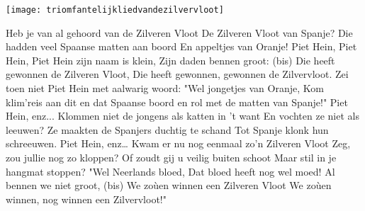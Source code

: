 \begin{intersong}
    \texttt{[image: triomfantelijkliedvandezilvervloot]}
\end{intersong}
\beginverse*
Heb je van al gehoord van de Zilveren Vloot
De Zilveren Vloot van Spanje?
Die hadden veel Spaanse matten aan boord
En appeltjes van Oranje!
Piet Hein, Piet Hein,
Piet Hein zijn naam is klein,
Zijn daden bennen groot: (bis)
Die heeft gewonnen de Zilveren Vloot,
Die heeft gewonnen, gewonnen de Zilvervloot.
\endverse
\beginverse*
Zei toen niet Piet Hein met aalwarig woord:
"Wel jongetjes van Oranje,
Kom klim'reis aan dit en dat Spaanse boord
en rol met de matten van Spanje!"
Piet Hein, enz...
\endverse
\beginverse*
Klommen niet de jongens als katten in 't want
En vochten ze niet als leeuwen?
Ze maakten de Spanjers duchtig te schand
Tot Spanje klonk hun schreeuwen.
Piet Hein, enz…
\endverse
\beginverse*
Kwam er nu nog eenmaal zo'n Zilveren Vloot
Zeg, zou jullie nog zo kloppen?
Of zoudt gij u veilig buiten schoot
Maar stil in je hangmat stoppen?
"Wel Neerlands bloed,
Dat bloed heeft nog wel moed!
Al bennen we niet groot, (bis)
We zoùen winnen een Zilveren Vloot
We zoùen winnen, nog winnen een Zilvervloot!"
\endverse
\endsong